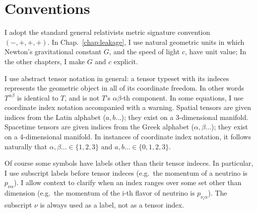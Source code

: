 
\section{Conventions}
\label{sec:conventions}

I adopt the standard general relativists metric signature convention
$(-,+,+,+)$.
In Chap.~\ref{chap:leakage}, I use natural geometric units
in which Newton's gravitational constant $G$, and the speed of light $c$, have unit
value; In the other chapters, I make $G$ and $c$ explicit.

I use abstract tensor notation in general: a tensor typeset with its indeces
represents the geometric object in all of its coordinate freedom. In other words
$T^{\alpha \beta}$ is identical to $T$, and is not $T$'s $\alpha\beta$-th
component.
In some equations, I use coordinate index notation accompanied with a warning.
Spatial tensors are given indices from the Latin alphabet ($a,b...$);
they exist on a 3-dimensional manifold. Spacetime tensors are given indices from
the Greek alphabet ($\alpha,\beta...$); they exist on a 4-dimensional manifold.
In instances of coordinate index notation, it follows naturally that
$\alpha,\beta...\in\{1,2,3\}$ and $a,b...\in\{0,1,2,3\}$.

Of course some symbols have labels other than their tensor indeces.
In particular, I use subscript labels before tensor indeces (e.g.\ the
momentum of a neutrino is $p_{\nu \alpha}$). I allow context to clarify when
an index ranges over some set other than dimension (e.g.\ the momentum of the
i-th flavor of neutrino is $p_{\nu_i \alpha}$). The subscript $\nu$ is always
used as a label, not as a tensor index.

